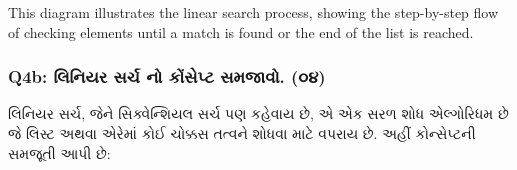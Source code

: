 \begin{Shaded}
\begin{Highlighting}[]
\end{Highlighting}
\end{Shaded}

This diagram illustrates the linear search process, showing the
step-by-step flow of checking elements until a match is found or the end
of the list is reached.

\hypertarget{q4b-uxab2uxaa8uxaafuxab0-uxab8uxab0uxa9a-uxaa8-uxa95uxab8uxaaauxa9f-uxab8uxaaeuxa9cuxab5.-uxae6uxaea}{%
\subsubsection{Q4b: લિનિયર સર્ચ નો કોંસેપ્ટ સમજાવો.
(૦૪)}\label{q4b-uxab2uxaa8uxaafuxab0-uxab8uxab0uxa9a-uxaa8-uxa95uxab8uxaaauxa9f-uxab8uxaaeuxa9cuxab5.-uxae6uxaea}}

લિનિયર સર્ચ, જેને સિક્વેન્શિયલ સર્ચ પણ કહેવાય છે, એ એક સરળ શોધ એલ્ગોરિધમ છે જે લિસ્ટ
અથવા એરેમાં કોઈ ચોક્કસ તત્વને શોધવા માટે વપરાય છે. અહીં કોન્સેપ્ટની સમજૂતી આપી છે:

